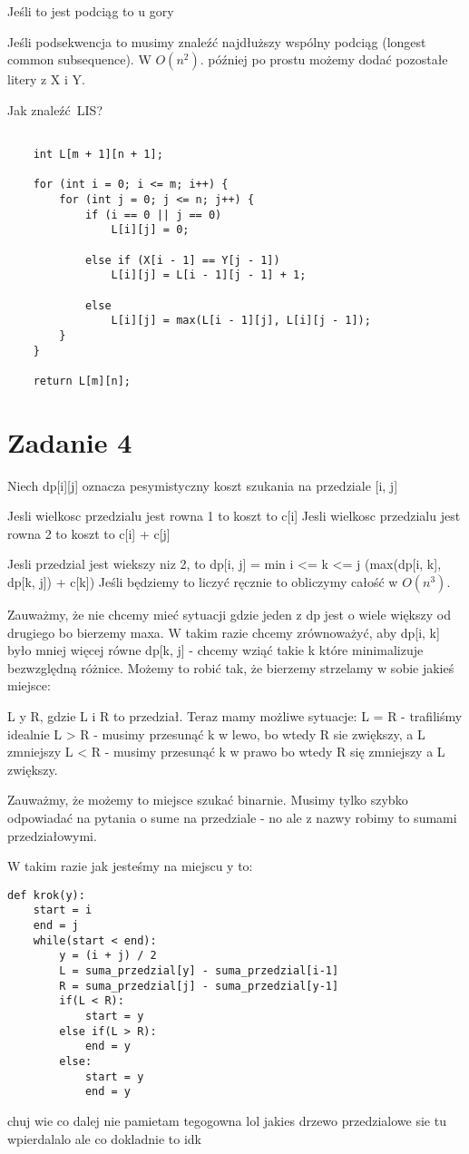 \documentclass[12pt]{article}
\begin{document}
Jeśli to jest podciąg to u gory

Jeśli podsekwencja to musimy znaleźć najdłuższy wspólny podciąg (longest common subsequence). W $O(n^2)$. później po prostu możemy dodać pozostałe litery z X i Y.

Jak znaleźć LIS? 
\begin{lstlisting}
        
	int L[m + 1][n + 1]; 
  
    for (int i = 0; i <= m; i++) { 
        for (int j = 0; j <= n; j++) { 
            if (i == 0 || j == 0) 
                L[i][j] = 0; 
  
            else if (X[i - 1] == Y[j - 1]) 
                L[i][j] = L[i - 1][j - 1] + 1; 
  
            else
                L[i][j] = max(L[i - 1][j], L[i][j - 1]); 
        } 
    } 
  
    return L[m][n]; 
\end{lstlisting}

\section{Zadanie 4}

Niech dp[i][j] oznacza pesymistyczny koszt szukania na przedziale [i, j]

Jesli wielkosc przedzialu jest rowna 1 to koszt to c[i]
Jesli wielkosc przedzialu jest rowna 2 to koszt to c[i] + c[j] 

Jesli przedzial jest wiekszy niz 2, to 
dp[i, j] = min i <= k <= j (max(dp[i, k], dp[k, j]) + c[k])
Jeśli będziemy to liczyć ręcznie to obliczymy całość w $O(n^3).$


Zauważmy, że nie chcemy mieć sytuacji gdzie jeden z dp jest o wiele większy od drugiego bo bierzemy maxa. W takim razie chcemy zrównoważyć, aby dp[i, k] było mniej więcej równe dp[k, j] - chcemy wziąć takie k które minimalizuje bezwzględną różnice.
Możemy to robić tak, że bierzemy strzelamy w sobie jakieś miejsce:

L y R, gdzie L i R to przedział.
Teraz mamy możliwe sytuacje:
L = R - trafiliśmy idealnie
L > R - musimy przesunąć k w lewo, bo wtedy R sie zwiększy, a L zmniejszy 
L < R - musimy przesunąć k w prawo bo wtedy R się zmniejszy a L zwiększy.

Zauważmy, że możemy to miejsce szukać binarnie. Musimy tylko szybko odpowiadać na pytania o sume na przedziale - no ale z nazwy robimy to sumami przedziałowymi.

W takim razie jak jesteśmy na miejscu y to:
\begin{lstlisting}
def krok(y):
    start = i
    end = j
    while(start < end):
        y = (i + j) / 2
        L = suma_przedzial[y] - suma_przedzial[i-1]
        R = suma_przedzial[j] - suma_przedzial[y-1]
        if(L < R):
            start = y
        else if(L > R):
            end = y 
        else:
            start = y
            end = y
\end{lstlisting}
chuj wie co dalej nie pamietam tegogowna lol 
jakies drzewo przedzialowe sie tu wpierdalalo ale co dokladnie to idk
\end{document}

